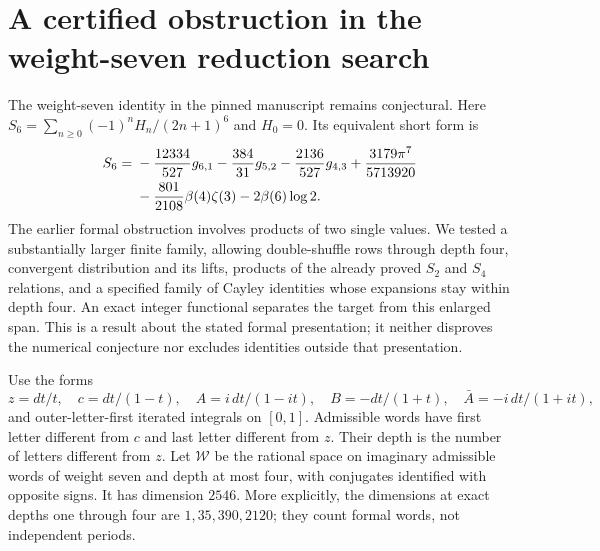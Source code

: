 \documentclass[11pt,a4paper]{article}
\numberwithin{equation}{section}
\theoremstyle{definition}
\theoremstyle{remark}
\begin{document}
\section{A certified obstruction in the weight-seven reduction search}
\label{s6bounded:sec}

The weight-seven identity in the pinned manuscript \cite{repo} remains conjectural.
Here $S_6=\sum_{n\ge0}(-1)^nH_n/(2n+1)^6$ and $H_0=0$.
Its equivalent short form is
\begin{align}
 S_6={}&-\frac{12334}{527}g_{6,1}-\frac{384}{31}g_{5,2}
 -\frac{2136}{527}g_{4,3}+\frac{3179\pi^7}{5713920}\notag\\
 &-\frac{801}{2108}\beta(4)\zeta(3)-2\beta(6)\log2.
 \label{s6bounded:eq:conjecture}
\end{align}
The earlier formal obstruction involves products of two single values.
We tested a substantially larger finite family, allowing double-shuffle
rows through depth four, convergent distribution and its lifts,
products of the already proved $S_2$ and $S_4$ relations, and a specified
family of Cayley identities whose expansions stay within depth four.
An exact integer functional separates the target from this enlarged
span. This is a result about the stated formal presentation; it neither
disproves the numerical conjecture nor excludes identities outside that
presentation.

Use the forms
\[
 z=dt/t,\quad c=dt/(1-t),\quad
 A=i\,dt/(1-it),\quad B=-dt/(1+t),\quad
 \bar A=-i\,dt/(1+it),
\]
and outer-letter-first iterated integrals on $[0,1]$. Admissible words
have first letter different from $c$ and last letter different from $z$.
Their depth is the number of letters different from $z$. Let $\mathcal W$
be the rational space on imaginary admissible words of weight seven and
depth at most four, with conjugates identified with opposite signs.
It has dimension $2546$. More explicitly, the dimensions at exact
depths one through four are $1,35,390,2120$; they count formal words,
not independent periods.
\end{document}
